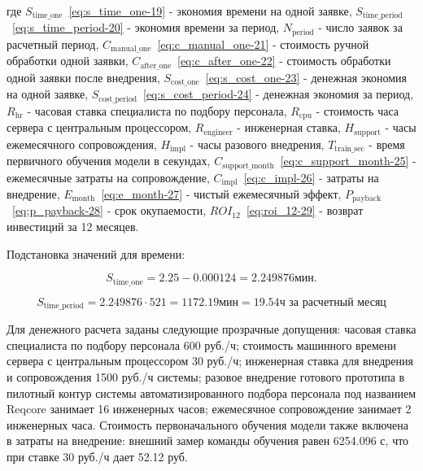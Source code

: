 где $S_{\text{time\_one}}$~\eqref{eq:s_time_one-19} - экономия времени на одной заявке, $S_{\text{time\_period}}$~\eqref{eq:s_time_period-20} - экономия времени за период, $N_{\text{period}}$ - число заявок за расчетный период, $C_{\text{manual\_one}}$~\eqref{eq:c_manual_one-21} - стоимость ручной обработки одной заявки, $C_{\text{after\_one}}$~\eqref{eq:c_after_one-22} - стоимость обработки одной заявки после внедрения, $S_{\text{cost\_one}}$~\eqref{eq:s_cost_one-23} - денежная экономия на одной заявке, $S_{\text{cost\_period}}$~\eqref{eq:s_cost_period-24} - денежная экономия за период, $R_{\text{hr}}$ - часовая ставка специалиста по подбору персонала, $R_{\text{cpu}}$ - стоимость часа сервера с центральным процессором, $R_{\text{engineer}}$ - инженерная ставка, $H_{\text{support}}$ - часы ежемесячного сопровождения, $H_{\text{impl}}$ - часы разового внедрения, $T_{\text{train\_sec}}$ - время первичного обучения модели в секундах, $C_{\text{support\_month}}$~\eqref{eq:c_support_month-25} - ежемесячные затраты на сопровождение, $C_{\text{impl}}$~\eqref{eq:c_impl-26} - затраты на внедрение, $E_{\text{month}}$~\eqref{eq:e_month-27} - чистый ежемесячный эффект, $P_{\text{payback}}$~\eqref{eq:p_payback-28} - срок окупаемости, $ROI_{12}$~\eqref{eq:roi_12-29} - возврат инвестиций за 12 месяцев.

Подстановка значений для времени:

\begin{equation}
\label{eq:s_time_one-30}
S_{\text{time\_one}} = 2.25 - 0.000124 = 2.249876 \text{мин.}
\end{equation}

\begin{equation}
\label{eq:s_time_period-31}
S_{\text{time\_period}} = 2.249876 \cdot 521 = 1172.19 \text{мин}= 19.54 \text{ч за расчетный месяц}
\end{equation}

Для денежного расчета заданы следующие прозрачные допущения: часовая ставка специалиста по подбору персонала 600 руб./ч; стоимость машинного времени сервера с центральным процессором 30 руб./ч; инженерная ставка для внедрения и сопровождения 1500 руб./ч системы; разовое внедрение готового прототипа в пилотный контур системы автоматизированного подбора персонала под названием Reqcore занимает 16 инженерных часов; ежемесячное сопровождение занимает 2 инженерных часа. Стоимость первоначального обучения модели также включена в затраты на внедрение: внешний замер команды обучения равен 6254.096 с, что при ставке 30 руб./ч дает 52.12 руб.

